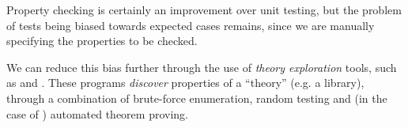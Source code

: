 Property checking is certainly an improvement over unit testing, but the problem
of tests being biased towards expected cases remains, since we are manually
specifying the properties to be checked.

We can reduce this bias further through the use of \emph{theory exploration}
tools, such as \qspec{} and \hspec{}. These programs \emph{discover} properties
of a ``theory'' (e.g. a library), through a combination of brute-force
enumeration, random testing and (in the case of \hspec{}) automated theorem
proving.
